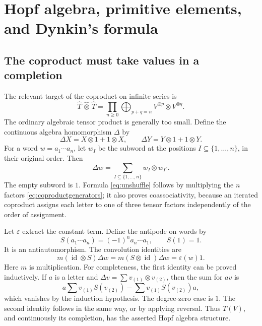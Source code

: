 \documentclass[11pt]{article}
\numberwithin{equation}{section}
\theoremstyle{definition}
\theoremstyle{remark}
\DeclareMathOperator{\id}{id}
\newcommand{\eps}{\varepsilon}
\begin{document}
\section{Hopf algebra, primitive elements, and Dynkin's formula}\label{sec:hopf}
\subsection{The coproduct must take values in a completion}
The relevant target of the coproduct on infinite series is
\[
 \widehat T\,\widehat\otimes\,\widehat T
 =\prod_{n\geq0}\bigoplus_{p+q=n}V^{\otimes p}\otimes V^{\otimes q}.
\]
The ordinary algebraic tensor product is generally too small. Define the
continuous algebra homomorphism $\Delta$ by
\begin{equation}\label{eq:coproductgenerators}
 \Delta X=X\otimes1+1\otimes X,\qquad
 \Delta Y=Y\otimes1+1\otimes Y.
\end{equation}
For a word $w=a_1\cdots a_n$, let $w_I$ be the subword at the positions
$I\subseteq\{1,\ldots,n\}$, in their original order. Then
\begin{equation}\label{eq:unshuffle}
 \Delta w=\sum_{I\subseteq\{1,\ldots,n\}}w_I\otimes w_{I^c}.
\end{equation}
The empty subword is $1$. Formula \eqref{eq:unshuffle} follows by
multiplying the $n$ factors \eqref{eq:coproductgenerators}; it also proves
coassociativity, because an iterated coproduct assigns each letter to
one of three tensor factors independently of the order of assignment.

Let $\eps$ extract the constant term. Define the antipode on words by
\begin{equation}\label{eq:antipode}
 S(a_1\cdots a_n)=(-1)^n a_n\cdots a_1,\qquad S(1)=1.
\end{equation}
It is an antiautomorphism. The convolution identities are
\begin{equation}\label{eq:antipodeidentities}
 m(\id\otimes S)\Delta w=m(S\otimes\id)\Delta w=\eps(w)1.
\end{equation}
Here $m$ is multiplication. For completeness, the first identity can be
proved inductively. If $a$ is a letter and
$\Delta v=\sum v_{(1)}\otimes v_{(2)}$, then the sum for $av$ is
\[
 a\sum v_{(1)}S(v_{(2)})-
 \sum v_{(1)}S(v_{(2)})a,
\]
which vanishes by the induction hypothesis. The degree-zero case is $1$.
The second identity follows in the same way, or by applying reversal.
Thus $T(V)$, and continuously its completion, has the asserted Hopf
algebra structure.
\end{document}
